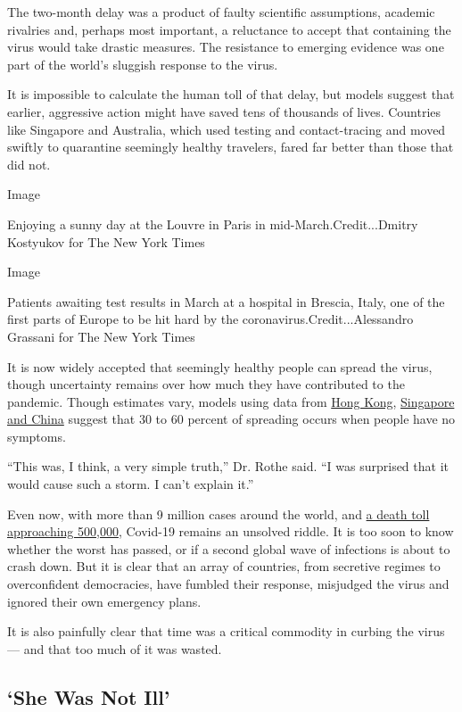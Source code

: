 The two-month delay was a product of faulty scientific assumptions,
academic rivalries and, perhaps most important, a reluctance to accept
that containing the virus would take drastic measures. The resistance to
emerging evidence was one part of the world's sluggish response to the
virus.

It is impossible to calculate the human toll of that delay, but models
suggest that earlier, aggressive action might have saved tens of
thousands of lives. Countries like Singapore and Australia, which used
testing and contact-tracing and moved swiftly to quarantine seemingly
healthy travelers, fared far better than those that did not.

Image

Enjoying a sunny day at the Louvre in Paris in mid-March.Credit...Dmitry
Kostyukov for The New York Times

Image

Patients awaiting test results in March at a hospital in Brescia, Italy,
one of the first parts of Europe to be hit hard by the
coronavirus.Credit...Alessandro Grassani for The New York Times

It is now widely accepted that seemingly healthy people can spread the
virus, though uncertainty remains over how much they have contributed to
the pandemic. Though estimates vary, models using data from
\href{https://www.nature.com/articles/s41591-020-0869-5}{Hong Kong},
\href{https://www.eurosurveillance.org/content/10.2807/1560-7917.ES.2020.25.17.2000257}{Singapore
and China} suggest that 30 to 60 percent of spreading occurs when people
have no symptoms.

``This was, I think, a very simple truth,'' Dr. Rothe said. ``I was
surprised that it would cause such a storm. I can't explain it.''

Even now, with more than 9 million cases around the world, and
\href{https://www.nytimes.com/interactive/2020/world/coronavirus-maps.html}{a
death toll approaching 500,000}, Covid-19 remains an unsolved riddle. It
is too soon to know whether the worst has passed, or if a second global
wave of infections is about to crash down. But it is clear that an array
of countries, from secretive regimes to overconfident democracies, have
fumbled their response, misjudged the virus and ignored their own
emergency plans.

It is also painfully clear that time was a critical commodity in curbing
the virus --- and that too much of it was wasted.

\hypertarget{she-was-not-ill}{%
\subsection{`She Was Not Ill'}\label{she-was-not-ill}}

